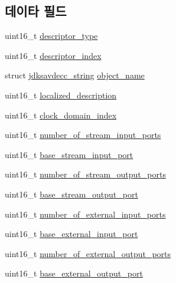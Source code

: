 \subsection*{데이타 필드}
\begin{DoxyCompactItemize}
\item 
uint16\+\_\+t \hyperlink{structjdksavdecc__descriptor__video__unit_ab7c32b6c7131c13d4ea3b7ee2f09b78d}{descriptor\+\_\+type}
\item 
uint16\+\_\+t \hyperlink{structjdksavdecc__descriptor__video__unit_a042bbc76d835b82d27c1932431ee38d4}{descriptor\+\_\+index}
\item 
struct \hyperlink{structjdksavdecc__string}{jdksavdecc\+\_\+string} \hyperlink{structjdksavdecc__descriptor__video__unit_a7d1f5945a13863b1762fc6db74fa8f80}{object\+\_\+name}
\item 
uint16\+\_\+t \hyperlink{structjdksavdecc__descriptor__video__unit_a0926f846ca65a83ad5bb06b4aff8f408}{localized\+\_\+description}
\item 
uint16\+\_\+t \hyperlink{structjdksavdecc__descriptor__video__unit_a6608f023d147b556a49527d568abed8e}{clock\+\_\+domain\+\_\+index}
\item 
uint16\+\_\+t \hyperlink{structjdksavdecc__descriptor__video__unit_ad00c23883f3271704e11719abc6f7ad7}{number\+\_\+of\+\_\+stream\+\_\+input\+\_\+ports}
\item 
uint16\+\_\+t \hyperlink{structjdksavdecc__descriptor__video__unit_a8ad4ba35aee3ad22d5e946438bbaba53}{base\+\_\+stream\+\_\+input\+\_\+port}
\item 
uint16\+\_\+t \hyperlink{structjdksavdecc__descriptor__video__unit_a6b331604e3f2b2db126dbf0a7c81b0fa}{number\+\_\+of\+\_\+stream\+\_\+output\+\_\+ports}
\item 
uint16\+\_\+t \hyperlink{structjdksavdecc__descriptor__video__unit_a234b990d7bb2f22da0ba4bebadc71a70}{base\+\_\+stream\+\_\+output\+\_\+port}
\item 
uint16\+\_\+t \hyperlink{structjdksavdecc__descriptor__video__unit_a7e5320abe3b528f879c3314a19269335}{number\+\_\+of\+\_\+external\+\_\+input\+\_\+ports}
\item 
uint16\+\_\+t \hyperlink{structjdksavdecc__descriptor__video__unit_a292b30d547e9769f7ec471a9e26ae2c2}{base\+\_\+external\+\_\+input\+\_\+port}
\item 
uint16\+\_\+t \hyperlink{structjdksavdecc__descriptor__video__unit_ae7140af180c1c9cc1f5a6a414fe26ebb}{number\+\_\+of\+\_\+external\+\_\+output\+\_\+ports}
\item 
uint16\+\_\+t \hyperlink{structjdksavdecc__descriptor__video__unit_a3103a3898813f4104c1d1d7f984e8229}{base\+\_\+external\+\_\+output\+\_\+port}

\end{DoxyCompactItemize}

